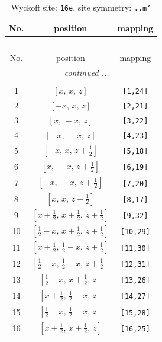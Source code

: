 \documentclass[fleqn,8pt]{jsarticle}
\begin{document}
\renewcommand{\arraystretch}{1.2}
\begin{longtable}{ccc}
\caption{Wyckoff site: {\tt 16e}, site symmetry: {\tt ..m'}}
 \\
 \hline \hline
No. & position & mapping \\ \hline \endfirsthead

\multicolumn{2}{l}{\tablename\ \thetable{}} \\
 \hline \hline
No. & position & mapping \\ \hline \endhead

 \hline \hline
\multicolumn{2}{r}{\footnotesize\it continued ...} \\ \endfoot

 \hline \hline
\multicolumn{2}{r}{} \\ \endlastfoot

1 & $\left[ x,\, x,\, z \right]$ & {\tt [1,24]} \\ \hline
2 & $\left[ - x,\, x,\, z \right]$ & {\tt [2,21]} \\ \hline
3 & $\left[ x,\, - x,\, z \right]$ & {\tt [3,22]} \\ \hline
4 & $\left[ - x,\, - x,\, z \right]$ & {\tt [4,23]} \\ \hline
5 & $\left[ - x,\, x,\, z + \frac{1}{2} \right]$ & {\tt [5,18]} \\ \hline
6 & $\left[ x,\, - x,\, z + \frac{1}{2} \right]$ & {\tt [6,19]} \\ \hline
7 & $\left[ - x,\, - x,\, z + \frac{1}{2} \right]$ & {\tt [7,20]} \\ \hline
8 & $\left[ x,\, x,\, z + \frac{1}{2} \right]$ & {\tt [8,17]} \\ \hline
9 & $\left[ x + \frac{1}{2},\, x + \frac{1}{2},\, z + \frac{1}{2} \right]$ & {\tt [9,32]} \\ \hline
10 & $\left[ \frac{1}{2} - x,\, x + \frac{1}{2},\, z + \frac{1}{2} \right]$ & {\tt [10,29]} \\ \hline
11 & $\left[ x + \frac{1}{2},\, \frac{1}{2} - x,\, z + \frac{1}{2} \right]$ & {\tt [11,30]} \\ \hline
12 & $\left[ \frac{1}{2} - x,\, \frac{1}{2} - x,\, z + \frac{1}{2} \right]$ & {\tt [12,31]} \\ \hline
13 & $\left[ \frac{1}{2} - x,\, x + \frac{1}{2},\, z \right]$ & {\tt [13,26]} \\ \hline
14 & $\left[ x + \frac{1}{2},\, \frac{1}{2} - x,\, z \right]$ & {\tt [14,27]} \\ \hline
15 & $\left[ \frac{1}{2} - x,\, \frac{1}{2} - x,\, z \right]$ & {\tt [15,28]} \\ \hline
16 & $\left[ x + \frac{1}{2},\, x + \frac{1}{2},\, z \right]$ & {\tt [16,25]} \\
\end{longtable}
\end{document}
